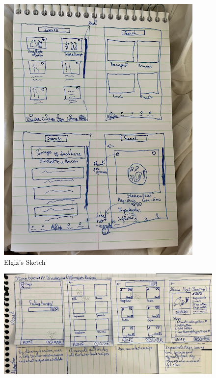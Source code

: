\documentclass[11pt,english]{article}
\begin{document}
\begin{figure}
\centering
  \includegraphics[width=\linewidth]{figure5.jpg}
  \caption{Elgiz's Sketch}
  \label{fig:figure5}
\end{figure}

\begin{figure}
\centering
  \includegraphics[width=\linewidth]{figure6v1.png}
\end{figure}
\end{document}
